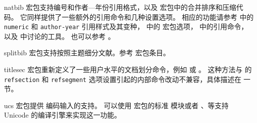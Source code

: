 \begin{marglist}
\item[natbib]
 宏包支持编号和作者---年份引用格式，以及 宏包中的合并排序和压缩代码。
它同样提供了一些额外的引用命令和几种设置选项。
相应的功能请参考  中的 \texttt{numeric} 和 \texttt{author-year} 引用样式及其变种，
中的  宏包选项， 中的引用命令，
以及  中讨论的工具。
也可以参考 。

\item[splitbib]
 宏包支持按照主题细分文献。参考  宏包条目。

\item[titlesec]
 宏包重新定义了一些用户水平的文档划分命令，例如  或 。
这种方法与 \biblatex 的 \texttt{refsection} 和 \texttt{refsegment} 选项设置引起的内部命令改动不兼容，具体描述在  一节。

\item[ucs]
 宏包提供 \utf 编码输入的支持。
可以使用  宏包的标准  模块或者 \XeTeX 、\LuaTeX 等支持 Unicode 的编译引擎来实现这一功能。

\end{marglist}

